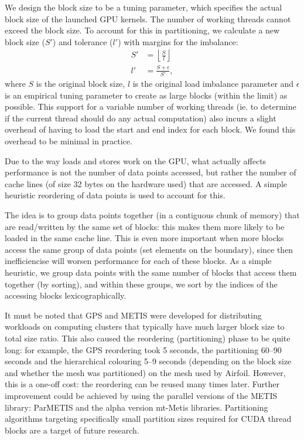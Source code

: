 We design the block size to be a tuning parameter, which specifies the actual
block size of the launched GPU kernels. The number of working threads
cannot exceed the block size. To account for this in partitioning, we calculate 
a new block size ($S'$) and tolerance ($l'$) with margins for the imbalance:
\begin{align}
  S' &= \left\lfloor \frac{S}{l} \right\rfloor \\
  l' &= \frac{S + \epsilon}{S'},
\end{align}
where $S$ is the original block size, $l$ is the original load imbalance
parameter and $\epsilon$ is an empirical tuning parameter to create as large
blocks (within the limit) as possible. This support for a variable number of 
working threads (ie. to determine if the current thread should do any actual 
computation) also incurs a slight overhead of having to load the start and end 
index for each block. We found this overhead to be minimal in practice.

Due to the way loads and stores work on the GPU, what actually affects
performance is not the number of data points accessed, but rather the number of
cache lines (of size 32 bytes on the hardware used) that are accessed. A simple 
heuristic reordering of data points is used to account for this. 

The idea is to group data points together (in a contiguous chunk of memory)
that are read/written by the same set of blocks: this makes them more likely to
be loaded in the same cache line. This is even more important when more blocks
access the same group of data points (set elements on the boundary), since then
inefficiencise will worsen performance for each of these blocks. As a simple
heuristic, we group data points with the same number of blocks that access them
together (by sorting), and within these groups, we sort by the indices of the
accessing blocks lexicographically.

It must be noted that GPS and METIS were developed for distributing workloads on
computing clusters that typically have much larger block size to total size
ratio. This also caused the reordering (partitioning) phase to be quite long:
for example, the GPS reordering took 5 seconds, the partitioning 60--90 seconds
and the hierarchical colouring 5--9 seconds (depending on the block size and
whether the mesh was partitioned) on the mesh used by Airfoil. However, this is
a one-off cost: the reordering can be reused many times later. Further
improvement could be achieved by using the parallel versions of the METIS
library: ParMETIS\cite{parmetis} and the alpha version mt-Metis\cite{mtmetis}
libraries. Partitioning algorithms targeting specifically small partition sizes
required for CUDA thread blocks are a target of future research.

